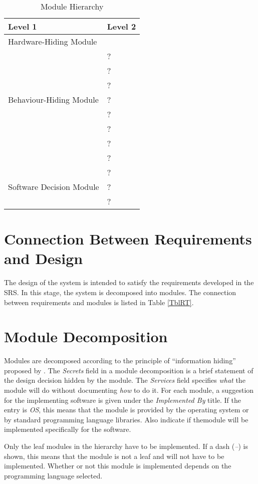 \documentclass[12pt, titlepage]{article}
\newcommand{\newSection}[1]{
  \newpage
  \section{#1}
}
\begin{document}
	\begin{table}[h!]
		\centering
		\begin{tabular}{p{} p{}}
			\toprule
			\textbf{Level 1} & \textbf{Level 2}\\
			\midrule

			{Hardware-Hiding Module} & ~ \\
			\midrule

			\multirow{7}{0.3\textwidth}{Behaviour-Hiding Module} & ?\\
			& ?\\
			& ?\\
			& ?\\
			& ?\\
			& ?\\
			& ?\\ 
			& ?\\
			\midrule

			\multirow{3}{0.3\textwidth}{Software Decision Module} & {?}\\
			& ?\\
			& ?\\
			\bottomrule

		\end{tabular}
		\caption{Module Hierarchy}
		\label{TblMH}
	\end{table}

\newSection{Connection Between Requirements and Design} \label{SecConnection}

	The design of the system is intended to satisfy the requirements developed in the SRS. In this stage, the system is decomposed into modules. The connection between requirements and modules is listed in Table \ref{TblRT}.

\newSection{Module Decomposition} \label{SecMD}

	Modules are decomposed according to the principle of ``information hiding'' proposed by \citet{ParnasEtAl1984}. The \emph{Secrets} field in a module decomposition is a brief statement of the design decision hidden by the module. The \emph{Services} field specifies \emph{what} the module will do without documenting \emph{how} to do it. For each module, a suggestion for the implementing software is given under the \emph{Implemented By} title. If the entry is \emph{OS}, this means that the module is provided by the operating system or by standard programming language libraries.  Also indicate if themodule will be implemented specifically for the software.

	Only the leaf modules in the hierarchy have to be implemented. If a dash (\emph{--}) is shown, this means that the module is not a leaf and will not have to be implemented. Whether or not this module is implemented depends on the programming language selected.
\end{document}
